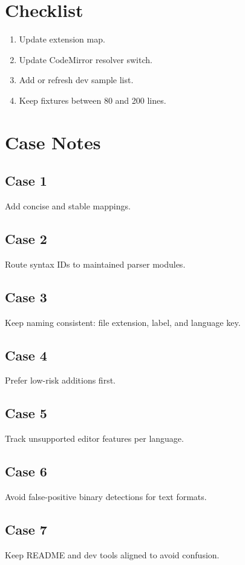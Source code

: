 \documentclass[11pt,a4paper]{article}
\begin{document}
\section{Checklist}
\begin{enumerate}
  \item Update extension map.
  \item Update CodeMirror resolver switch.
  \item Add or refresh dev sample list.
  \item Keep fixtures between 80 and 200 lines.
\end{enumerate}

\section{Case Notes}
\subsection{Case 1}
Add concise and stable mappings.

\subsection{Case 2}
Route syntax IDs to maintained parser modules.

\subsection{Case 3}
Keep naming consistent: file extension, label, and language key.

\subsection{Case 4}
Prefer low-risk additions first.

\subsection{Case 5}
Track unsupported editor features per language.

\subsection{Case 6}
Avoid false-positive binary detections for text formats.

\subsection{Case 7}
Keep README and dev tools aligned to avoid confusion.
\end{document}
